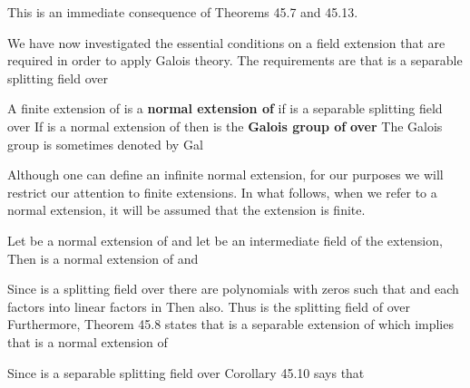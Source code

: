 \documentclass[11pt,oneside]{article}
\begin{document}
\begin{BookBody}
 This is an immediate consequence of Theorems 45.7 and 45.13. \BookEnd{\blacklozenge}


\noindent We have now investigated the essential conditions on a field extension  that are required in order to apply Galois theory. The requirements are that  is a separable splitting field over 

 A finite extension  of  is a\textbf{ normal extension of}  if  is a separable splitting field over  If  is a normal extension of  then  is the\textbf{ Galois group of}  \textbf{over}  The Galois group is sometimes denoted by Gal\BookEnd{\blacksquare}

Although one can define an infinite normal extension, for our purposes we will restrict our attention to finite extensions. In what follows, when we refer to a normal extension, it will be assumed that the extension is finite.

 Let  be a normal extension of  and let  be an intermediate field of the extension,  Then  is a normal extension of  and 

 Since  is a splitting field over  there are polynomials  with zeros  such that  and each  factors into linear factors in  Then  also. Thus  is the splitting field of  over  Furthermore, Theorem 45.8 states that  is a separable extension of  which implies that  is a normal extension of 

Since  is a separable splitting field over  Corollary 45.10 says that  \BookEnd{\blacklozenge}


\end{BookBody}
\end{document}
